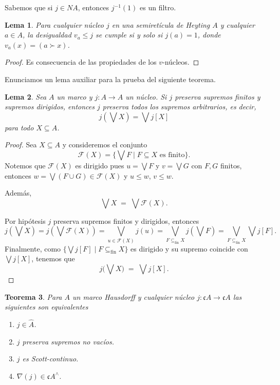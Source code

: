 \documentclass[11pt]{amsart}
\theoremstyle{plain}
\newtheorem{thm}{Teorema}[section]
\newtheorem{lem}[thm]{Lema}
\theoremstyle{definition}
\begin{document}
Sabemos que si $j\in NA$, entonces $j^{-1}(1)$ es un filtro.

\begin{lem}\label{Lema3.3}
    Para cualquier núcleo $j$ en una semiretícula de Heyting $A$ y cualquier $a\in A$, la desigualdad $v_a\leq j$ se cumple si y solo si $j(a)=1$, donde $v_a(x)=(a\succ x)$.
\end{lem}

\begin{proof}
Es consecuencia de las propiedades de los $v$-núcleos.
\end{proof}

Enunciamos un lema auxiliar para la prueba del siguiente teorema.

\begin{lem}\label{lem:nucleo-dirigidos-a-arbitrarios}
Sea $A$ un marco y $j\colon A\to A$ un núcleo. 
Si $j$ preserva supremos finitos y supremos dirigidos, entonces $j$ preserva todos los supremos arbitrarios, es decir,
\[
j(\bigvee X)=\bigvee j[X]
\]
para todo $X\subseteq A$.
\end{lem}

\begin{proof}
Sea $X\subseteq A$ y consideremos el conjunto
\[
\mathcal{F}(X)=\{\bigvee F\mid F\subseteq X\text{ es finito}\}.
\]
Notemos que $\mathcal{F}(X)$ es dirigido pues $u=\bigvee F$ y $v=\bigvee G$ con $F,G$ finitos, 
entonces $w=\bigvee(F\cup G)\in\mathcal{F}(X)$ y $u\le w$, $v\le w$.

Además, 
\[
\bigvee X\;=\;\bigvee \mathcal{F}(X).
\]

Por hipótesis $j$ preserva supremos finitos y dirigidos, entonces
\[
j(\bigvee X)=j(\bigvee \mathcal{F}(X))=\bigvee_{u\in \mathcal{F}(X)} j(u)=\bigvee_{F\subseteq_{\mathrm{fin}} X} j(\bigvee F)=\bigvee_{F\subseteq_{\mathrm{fin}} X} \bigvee j[F].
\]
Finalmente, como $\{\bigvee j[F]\mid F\subseteq_{\mathrm{fin}} X\}$ es dirigido y su supremo coincide con $\bigvee j[X]$, tenemos que
\[
j\!\Big(\bigvee X\Big)\;=\;\bigvee j[X].
\]
\end{proof}

\begin{thm}\label{Teorema3.4}
    Para $A$ un marco Hausdorff y cualquier núcleo $j\colon \mathfrak{c}A\to \mathfrak{c}A$ las siguientes son equivalentes
    \begin{enumerate}
        \item $j\in \hat{A}$.
        \item $j$ preserva supremos no vacíos.
        \item $j$ es Scott-continuo.
        \item $\nabla(j)\in \mathfrak{c}A^\wedge$.
    \end{enumerate}
\end{thm}
\end{document}
